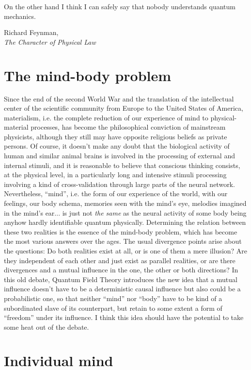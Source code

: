 \documentclass[10pt,a4paper,twoside,openany]{book}
\begin{document}
\renewcommand{\epigraphwidth}{8cm}
\epigraph{On the other hand I think I can safely say that nobody understands quantum mechanics.}{Richard Feynman,\\\textit{The Character of Physical Law}~\cite{Feynman1964}}

\section{The mind-body problem}

Since the end of the second World War and the translation of the intellectual center of the scientific community from Europe to the United States of America, materialism, i.e. the complete reduction of our experience of mind to physical-material processes, has become the philosophical conviction of mainstream physicists, although they still may have opposite religious beliefs as private persons. Of course, it doesn't make any doubt that the biological activity of human and similar animal brains is involved in the processing of external and internal stimuli, and it is reasonable to believe that conscious thinking consists, at the physical level, in a particularly long and intensive stimuli processing involving a kind of cross-validation through large parts of the neural network. Nevertheless, ``mind'', i.e. the form of our experience of the world, with our feelings, our body schema, memories seen with the mind's eye, melodies imagined in the mind's ear... is just not \textit{the same} as the neural activity of some body being anyhow hardly identifiable quantum physically. Determining the relation between these two realities is the essence of the mind-body problem, which has become the most various answers over the ages. The usual divergence points arise about the questions: Do both realities exist at all, or is one of them a mere illusion? Are they independent of each other and just exist as parallel realities, or are there divergences and a mutual influence in the one, the other or both directions? In this old debate, Quantum Field Theory introduces the new idea that a mutual influence doesn't have to be a deterministic causal influence but also could be a probabilistic one, so that neither ``mind'' nor ``body'' have to be kind of a subordinated slave of its counterpart, but retain to some extent a form of ``freedom'' under its influence. I think this idea should have the potential to take some heat out of the debate.

\section{Individual mind}
\end{document}
